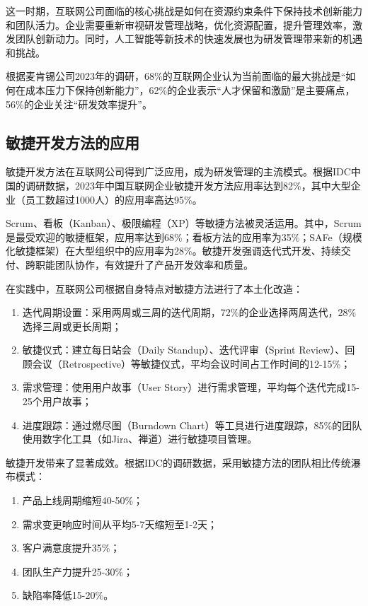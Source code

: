 这一时期，互联网公司面临的核心挑战是如何在资源约束条件下保持技术创新能力和团队活力\cite{tang2022motivation,xu2024theoretical}。企业需要重新审视研发管理战略，优化资源配置，提升管理效率，激发团队创新动力\cite{zhao2022diversity}。同时，人工智能等新技术的快速发展也为研发管理带来新的机遇和挑战\cite{li2024scientific,dou2018darpa}。

根据麦肯锡公司2023年的调研，68\%的互联网企业认为当前面临的最大挑战是“如何在成本压力下保持创新能力”，62\%的企业表示“人才保留和激励”是主要痛点，56\%的企业关注“研发效率提升”\cite{mckinsey2023tech}。

\subsection{敏捷开发方法的应用}

敏捷开发方法在互联网公司得到广泛应用，成为研发管理的主流模式\cite{mathieu2008team}。根据IDC中国的调研数据，2023年中国互联网企业敏捷开发方法应用率达到82\%，其中大型企业（员工数超过1000人）的应用率高达95\%\cite{idc2023agile}。

Scrum、看板（Kanban）、极限编程（XP）等敏捷方法被灵活运用\cite{damanpour2012managerial}。其中，Scrum是最受欢迎的敏捷框架，应用率达到68\%；看板方法的应用率为35\%；SAFe（规模化敏捷框架）在大型组织中的应用率为28\%\cite{idc2023agile}。敏捷开发强调迭代式开发、持续交付、跨职能团队协作，有效提升了产品开发效率和质量\cite{wei2012excellence}。

在实践中，互联网公司根据自身特点对敏捷方法进行了本土化改造：

\begin{enumerate}
\item 迭代周期设置：采用两周或三周的迭代周期，72\%的企业选择两周迭代，28\%选择三周或更长周期\cite{idc2023agile}；
\item 敏捷仪式：建立每日站会（Daily Standup）、迭代评审（Sprint Review）、回顾会议（Retrospective）等敏捷仪式，平均会议时间占工作时间的12-15\%；
\item 需求管理：使用用户故事（User Story）进行需求管理，平均每个迭代完成15-25个用户故事；
\item 进度跟踪：通过燃尽图（Burndown Chart）等工具进行进度跟踪，85\%的团队使用数字化工具（如Jira、禅道）进行敏捷项目管理。
\end{enumerate}

敏捷开发带来了显著成效。根据IDC的调研数据\cite{idc2023agile}，采用敏捷方法的团队相比传统瀑布模式：
\begin{enumerate}
\item 产品上线周期缩短40-50\%；
\item 需求变更响应时间从平均5-7天缩短至1-2天；
\item 客户满意度提升35\%；
\item 团队生产力提升25-30\%；
\item 缺陷率降低15-20\%\cite{idc2023agile}。
\end{enumerate}

